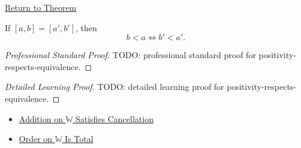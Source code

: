 \newpage
{}
\label{prf:positivity-respects-equivalence}

\begin{remark*}[Return]
\hyperref[lem:positivity-respects-equivalence]{Return to Theorem}
\end{remark*}

\begin{lemma*}
If $[a,b]=[a',b']$, then
\[
b<a \Longleftrightarrow b'<a'.
\]
\end{lemma*}

\begin{proof}[Professional Standard Proof]
\LRAProofBodyStart
TODO: professional standard proof for positivity-respects-equivalence.
\end{proof}

\begin{proof}[Detailed Learning Proof]
\LRAProofBodyStart
TODO: detailed learning proof for positivity-respects-equivalence.
\end{proof}

\begin{remark*}
\end{remark*}

\begin{dependencies}
\begin{itemize}
  \item \hyperref[thm:addition-on-w-cancellation]{Addition on $\mathbb{W}$ Satisfies Cancellation}
  \item \hyperref[thm:order-on-w-total]{Order on $\mathbb{W}$ Is Total}
\end{itemize}
\end{dependencies}

\clearpage
